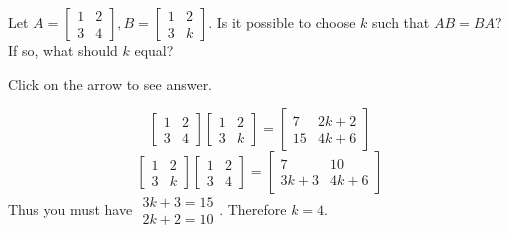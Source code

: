 \documentclass{ximera}
\begin{document}
\begin{problem}\label{prb:4.14} Let $A=\left[
\begin{array}{rr}
1 & 2 \\
3 & 4
\end{array}
\right] ,B=\left[
\begin{array}{rr}
1 & 2 \\
3 & k
\end{array}
\right] .$ Is it possible to choose $k$ such that $AB=BA?$ If so, what
should $k$ equal?

Click on the arrow to see answer.
\begin{expandable}{}{}
$$
\left[
\begin{array}{cc}
1 & 2 \\
3 & 4
\end{array}
\right] \left[
\begin{array}{cc}
1 & 2 \\
3 & k
\end{array}
\right] = \left[
\begin{array}{cc}
7 & 2k+2 \\
15 & 4k+6
\end{array}
\right] $$
$$ \left[
\begin{array}{cc}
1 & 2 \\
3 & k
\end{array}
\right] \left[
\begin{array}{cc}
1 & 2 \\
3 & 4
\end{array}
\right] = \left[
\begin{array}{cc}
7 & 10 \\
3k+3 & 4k+6
\end{array}
\right]
$$
 Thus you must have $
\begin{array}{c}
3k+3=15 \\
2k+2=10
\end{array}
$.  Therefore $k=4$.
\end{expandable}
\end{problem}
\end{document}
